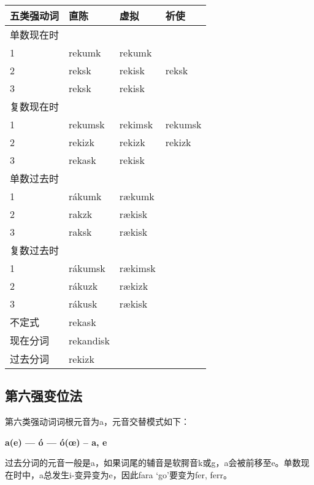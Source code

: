 \begin{longtable}{llll}
    \toprule
    五类强动词 & 直陈        & 虚拟      & 祈使      \\
    \midrule
    \endhead
    \bottomrule
    \endfoot
    单数现在时 &           &         &         \\
    1     & rekumk    & rekumk  &         \\
    2     & reksk     & rekisk  & reksk   \\
    3     & reksk     & rekisk  &         \\
    复数现在时 &           &         &         \\
    1     & rekumsk   & rekimsk & rekumsk \\
    2     & rekizk    & rekizk  & rekizk  \\
    3     & rekask    & rekisk  &         \\
    单数过去时 &           &         &         \\
    1     & rákumk    & rækumk  &         \\
    2     & rakzk     & rækisk  &         \\
    3     & raksk     & rækisk  &         \\
    复数过去时 &           &         &         \\
    1     & rákumsk   & rækimsk &         \\
    2     & rákuzk    & rækizk  &         \\
    3     & rákusk    & rækisk  &         \\
    不定式   & rekask    &         &         \\
    现在分词  & rekandisk &         &         \\
    过去分词  & rekizk    &         &         \\
\end{longtable}

\subsection{第六强变位法}\label{第六强变位法}

第六类强动词词根元音为a，元音交替模式如下：
\begin{center}
    \textbf{a(e) --- ó --- ó(œ) -- a, e}
\end{center}


过去分词的元音一般是a，如果词尾的辅音是软腭音k或g，a会被前移至e。单数现在时中，a总发生i-变异变为e，因此fara `go‌'要变为fer, ferr。

